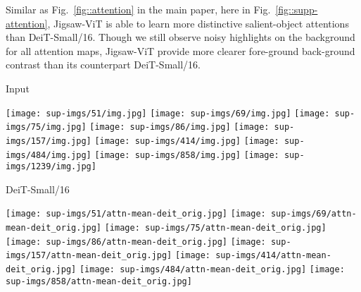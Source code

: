 \documentclass{article}
\begin{document}
Similar as Fig.~\ref{fig::attention} in the main paper, here in Fig.~\ref{fig::supp-attention}, Jigsaw-ViT is able to learn more distinctive salient-object attentions than DeiT-Small/16.
Though we still observe noisy highlights on the background for all attention maps, Jigsaw-ViT provide more clearer fore-ground back-ground contrast than its counterpart DeiT-Small/16.

\begin{figure*}[ht]
		\centering
		\begin{minipage}{0.1\textwidth}
		\centering
		\footnotesize{Input}
		\end{minipage}\hfill
		\begin{minipage}{0.9\textwidth}
		\centering
		\texttt{[image: sup-imgs/51/img.jpg]}
		\texttt{[image: sup-imgs/69/img.jpg]}
		\texttt{[image: sup-imgs/75/img.jpg]}
		\texttt{[image: sup-imgs/86/img.jpg]}
		\texttt{[image: sup-imgs/157/img.jpg]}
		\texttt{[image: sup-imgs/414/img.jpg]}
		\texttt{[image: sup-imgs/484/img.jpg]}
		\texttt{[image: sup-imgs/858/img.jpg]}
		\texttt{[image: sup-imgs/1239/img.jpg]}
		\end{minipage}\hfill
\begin{minipage}{0.1\textwidth}
		\centering
		\footnotesize{DeiT-Small/16}
		\end{minipage}\hfill
		\begin{minipage}{0.9\textwidth}
		\centering
		\texttt{[image: sup-imgs/51/attn-mean-deit\_orig.jpg]}
		\texttt{[image: sup-imgs/69/attn-mean-deit\_orig.jpg]}
		\texttt{[image: sup-imgs/75/attn-mean-deit\_orig.jpg]}
		\texttt{[image: sup-imgs/86/attn-mean-deit\_orig.jpg]}
		\texttt{[image: sup-imgs/157/attn-mean-deit\_orig.jpg]}
		\texttt{[image: sup-imgs/414/attn-mean-deit\_orig.jpg]}
		\texttt{[image: sup-imgs/484/attn-mean-deit\_orig.jpg]}
		\texttt{[image: sup-imgs/858/attn-mean-deit\_orig.jpg]}

\end{minipage}
\end{figure*}
\end{document}
